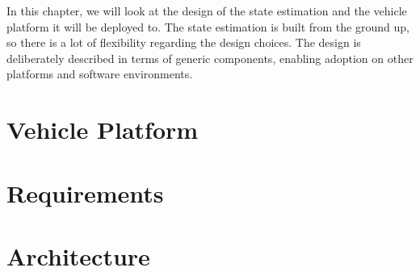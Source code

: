 In this chapter, we will look at the design of the state estimation and the vehicle platform it will be deployed to. The state estimation is built from the ground up, so there is a lot of flexibility regarding the design choices. The design is deliberately described in terms of generic components, enabling adoption on other platforms and software environments.

\section{Vehicle Platform}


\section{Requirements}\label{sec:design-requirements}


\section{Architecture}

